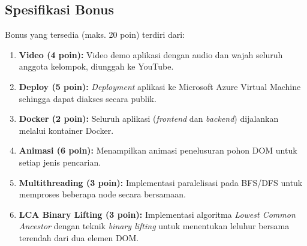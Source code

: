 \subsection{Spesifikasi Bonus}
Bonus yang tersedia (maks. 20 poin) terdiri dari:
\begin{enumerate}
    \item \textbf{Video (4 poin):} Video demo aplikasi dengan audio dan wajah seluruh anggota kelompok, diunggah ke YouTube.
    \item \textbf{Deploy (5 poin):} \textit{Deployment} aplikasi ke Microsoft Azure Virtual Machine sehingga dapat diakses secara publik.
    \item \textbf{Docker (2 poin):} Seluruh aplikasi (\textit{frontend} dan \textit{backend}) dijalankan melalui kontainer Docker.
    \item \textbf{Animasi (6 poin):} Menampilkan animasi penelusuran pohon DOM untuk setiap jenis pencarian.
    \item \textbf{Multithreading (3 poin):} Implementasi paralelisasi pada BFS/DFS untuk memproses beberapa node secara bersamaan.
    \item \textbf{LCA Binary Lifting (3 poin):} Implementasi algoritma \textit{Lowest Common Ancestor} dengan teknik \textit{binary lifting} untuk menentukan leluhur bersama terendah dari dua elemen DOM.
\end{enumerate}
